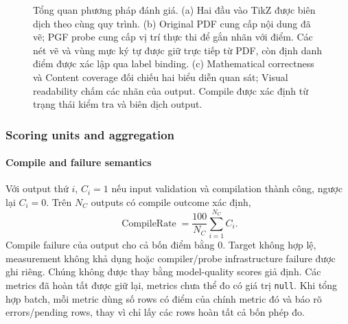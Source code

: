 \documentclass[a4paper,12pt]{article}
\begin{document}
\begin{figure}[tbp]
{
}
\caption{Tổng quan phương pháp đánh giá. (a) Hai đầu vào TikZ được biên dịch theo cùng quy trình. (b) Original PDF cung cấp nội dung đã vẽ; PGF probe cung cấp vị trí thực thi để gắn nhãn với điểm. Các nét vẽ và vùng mực ký tự được giữ trực tiếp từ PDF, còn định danh điểm được xác lập qua label binding. (c) Mathematical correctness và Content coverage đối chiếu hai biểu diễn quan sát; Visual readability chấm các nhãn của output. Compile được xác định từ trạng thái kiểm tra và biên dịch output.}
\label{fig:evaluation-pipeline}
\end{figure}

\subsubsection{Scoring units and aggregation}
\paragraph{Compile and failure semantics}
Với output thứ $i$, $C_i=1$ nếu input validation và compilation thành công, ngược lại $C_i=0$. Trên $N_C$ outputs có compile outcome xác định,
\begin{equation}
\operatorname{CompileRate}=\frac{100}{N_C}\sum_{i=1}^{N_C}C_i.
\end{equation}
Compile failure của output cho cả bốn điểm bằng 0. Target không hợp lệ, measurement không khả dụng hoặc compiler/probe infrastructure failure được ghi riêng. Chúng không được thay bằng model-quality scores giả định. Các metrics đã hoàn tất được giữ lại, metrics chưa thể đo có giá trị \texttt{null}. Khi tổng hợp batch, mỗi metric dùng số rows có điểm của chính metric đó và báo rõ errors/pending rows, thay vì chỉ lấy các rows hoàn tất cả bốn phép đo.
\end{document}

